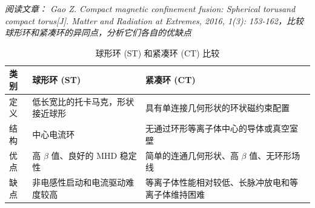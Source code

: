 \documentclass{article}
\begin{document}
\emph{阅读文章： Gao Z. Compact magnetic confinement fusion: Spherical torusand compact torus[J]. Matter and Radiation at Extremes, 2016, 1(3): 153-162，比较球形环和紧凑环的异同点，分析它们各自的优缺点}


\begin{table}[h]
    \centering
    \caption{球形环 (ST) 和紧凑环 (CT) 比较}
    \begin{tabular}{@{}lll@{}}
        \toprule
        类别 & 球形环 (ST) & 紧凑环 (CT) \\
        \midrule
        定义 & 低长宽比的托卡马克，形状接近球形 & 具有单连接几何形状的环状磁约束配置 \\
        结构 & 中心电流环 & 无通过环形等离子体中心的导体或真空室壁 \\
        \midrule
        优点 & 高 $\beta$ 值、良好的 MHD 稳定性 & 简单的连通几何形状、高 $\beta$ 值、无环形场线 \\
        \midrule
        缺点 & 非电感性启动和电流驱动难度较高 & 等离子体性能相对较低、长脉冲放电和等离子体维持困难 \\
        \bottomrule
    \end{tabular}
\end{table}
\end{document}
